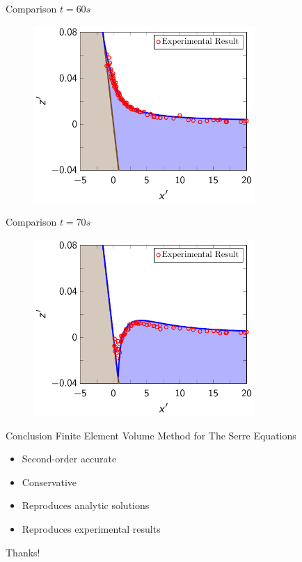 \documentclass[pdf]{beamer}
\begin{document}
\begin{frame}{Comparison $t=60s$}
	\begin{figure}
		\includegraphics[width=0.75\textwidth]{./Pics/Synolakis/t=60s.pdf}
	\end{figure}
\end{frame}

\begin{frame}{Comparison $t=70s$}
	\begin{figure}
		\includegraphics[width=0.75\textwidth]{./Pics/Synolakis/t=70s.pdf}
	\end{figure}
\end{frame}

\begin{frame}{Conclusion}
	Finite Element Volume Method for The Serre Equations
	\begin{itemize}
		\item Second-order accurate
		\pause 
		\item Conservative
		\pause
		\item Reproduces analytic solutions
		\pause
		\item Reproduces experimental results
	\end{itemize}
\end{frame}

\begin{frame}{}
	\centering \Huge Thanks!
\end{frame}
\end{document}
